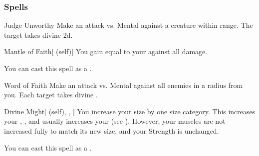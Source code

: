 \subsubsection{Spells}


\lowercase{\hypertarget{spell:Judge Unworthy}{}}\label{spell:Judge Unworthy}
\begin{apability}[\nth{1}]{\hypertarget{spell:Judge Unworthy}{Judge Unworthy}}
Make an attack vs. Mental against a creature within \rngmed range.
\hit The target takes divine  \plus2d.
\end{apability}
\vspace{0.25em}



\lowercase{\hypertarget{spell:Mantle of Faith}{}}\label{spell:Mantle of Faith}
\begin{attuneability}[\nth{1}]{\hypertarget{spell:Mantle of Faith}{Mantle of Faith}}[ (self)]
You gain  equal to your  against all damage.

You can cast this spell as a .
\end{attuneability}
\vspace{0.25em}



\lowercase{\hypertarget{spell:Word of Faith}{}}\label{spell:Word of Faith}
\begin{apability}[\nth{2}]{\hypertarget{spell:Word of Faith}{Word of Faith}}
Make an attack vs. Mental against all enemies in a \areamed radius from you.
\hit Each target takes divine .
\end{apability}
\vspace{0.25em}



\lowercase{\hypertarget{spell:Divine Might}{}}\label{spell:Divine Might}
\begin{attuneability}[\nth{3}]{\hypertarget{spell:Divine Might}{Divine Might}}[ (self), , ]
You increase your size by one size category.
This increases your , , and usually increases your  (see ).
However, your muscles are not increased fully to match its new size, and your Strength is unchanged.

You can cast this spell as a .
\end{attuneability}
\vspace{0.25em}




